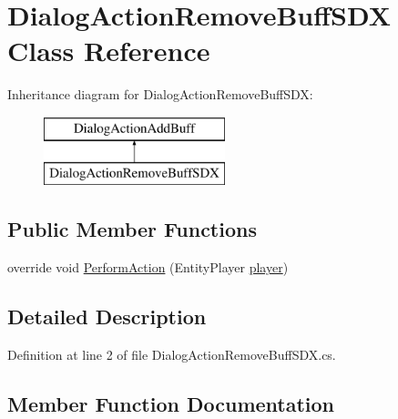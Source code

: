\hypertarget{class_dialog_action_remove_buff_s_d_x}{}\section{Dialog\+Action\+Remove\+Buff\+S\+DX Class Reference}
\label{class_dialog_action_remove_buff_s_d_x}
Inheritance diagram for Dialog\+Action\+Remove\+Buff\+S\+DX\+:\begin{figure}[H]
\begin{center}
\leavevmode
\includegraphics[height=2.000000cm]{class_dialog_action_remove_buff_s_d_x}
\end{center}
\end{figure}
\subsection*{Public Member Functions}
\begin{DoxyCompactItemize}
\item 
override void \mbox{\hyperlink{class_dialog_action_remove_buff_s_d_x_a383365dc78f3bfee958a5d1927949edf}{Perform\+Action}} (Entity\+Player \mbox{\hyperlink{_sphere_i_i_01_music_01_boxes_2_config_2_localization_8txt_a4e2cb8aeff651600ea1cc57fe5a929a4}{player}})
\end{DoxyCompactItemize}


\subsection{Detailed Description}


Definition at line 2 of file Dialog\+Action\+Remove\+Buff\+S\+D\+X.\+cs.



\subsection{Member Function Documentation}
\mbox{\label{class_dialog_action_remove_buff_s_d_x_a383365dc78f3bfee958a5d1927949edf}} 

